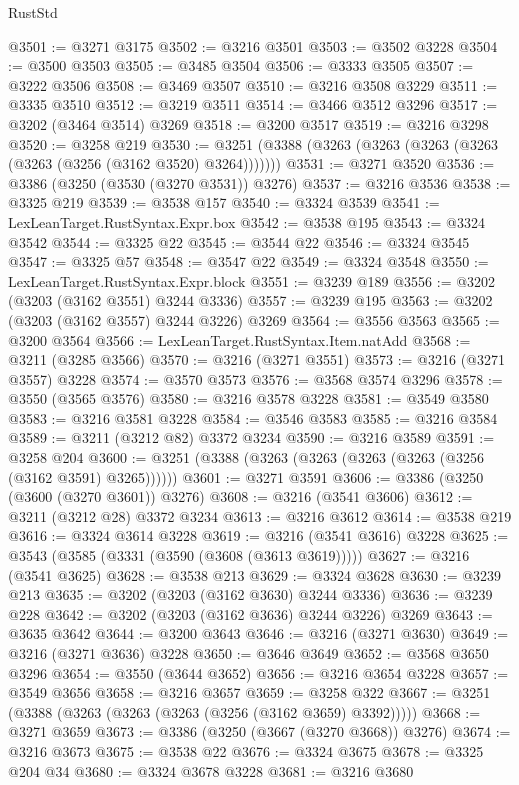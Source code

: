 \begin{lexlean}{RustStd}
\begin{coremodule}
@3501 := @3271 @3175
@3502 := @3216 @3501
@3503 := @3502 @3228
@3504 := @3500 @3503
@3505 := @3485 @3504
@3506 := @3333 @3505
@3507 := @3222 @3506
@3508 := @3469 @3507
@3510 := @3216 @3508 @3229
@3511 := @3335 @3510
@3512 := @3219 @3511
@3514 := @3466 @3512 @3296
@3517 := @3202 (@3464 @3514) @3269
@3518 := @3200 @3517
@3519 := @3216 @3298
@3520 := @3258 @219
@3530 := @3251 (@3388 (@3263 (@3263 (@3263 (@3263 (@3263 (@3256 (@3162 @3520) @3264)))))))
@3531 := @3271 @3520
@3536 := @3386 (@3250 (@3530 (@3270 @3531)) @3276)
@3537 := @3216 @3536
@3538 := @3325 @219
@3539 := @3538 @157
@3540 := @3324 @3539
@3541 := LexLeanTarget.RustSyntax.Expr.box
@3542 := @3538 @195
@3543 := @3324 @3542
@3544 := @3325 @22
@3545 := @3544 @22
@3546 := @3324 @3545
@3547 := @3325 @57
@3548 := @3547 @22
@3549 := @3324 @3548
@3550 := LexLeanTarget.RustSyntax.Expr.block
@3551 := @3239 @189
@3556 := @3202 (@3203 (@3162 @3551) @3244 @3336)
@3557 := @3239 @195
@3563 := @3202 (@3203 (@3162 @3557) @3244 @3226) @3269
@3564 := @3556 @3563
@3565 := @3200 @3564
@3566 := LexLeanTarget.RustSyntax.Item.natAdd
@3568 := @3211 (@3285 @3566)
@3570 := @3216 (@3271 @3551)
@3573 := @3216 (@3271 @3557) @3228
@3574 := @3570 @3573
@3576 := @3568 @3574 @3296
@3578 := @3550 (@3565 @3576)
@3580 := @3216 @3578 @3228
@3581 := @3549 @3580
@3583 := @3216 @3581 @3228
@3584 := @3546 @3583
@3585 := @3216 @3584
@3589 := @3211 (@3212 @82) @3372 @3234
@3590 := @3216 @3589
@3591 := @3258 @204
@3600 := @3251 (@3388 (@3263 (@3263 (@3263 (@3263 (@3256 (@3162 @3591) @3265))))))
@3601 := @3271 @3591
@3606 := @3386 (@3250 (@3600 (@3270 @3601)) @3276)
@3608 := @3216 (@3541 @3606)
@3612 := @3211 (@3212 @28) @3372 @3234
@3613 := @3216 @3612
@3614 := @3538 @219
@3616 := @3324 @3614 @3228
@3619 := @3216 (@3541 @3616) @3228
@3625 := @3543 (@3585 (@3331 (@3590 (@3608 (@3613 @3619)))))
@3627 := @3216 (@3541 @3625)
@3628 := @3538 @213
@3629 := @3324 @3628
@3630 := @3239 @213
@3635 := @3202 (@3203 (@3162 @3630) @3244 @3336)
@3636 := @3239 @228
@3642 := @3202 (@3203 (@3162 @3636) @3244 @3226) @3269
@3643 := @3635 @3642
@3644 := @3200 @3643
@3646 := @3216 (@3271 @3630)
@3649 := @3216 (@3271 @3636) @3228
@3650 := @3646 @3649
@3652 := @3568 @3650 @3296
@3654 := @3550 (@3644 @3652)
@3656 := @3216 @3654 @3228
@3657 := @3549 @3656
@3658 := @3216 @3657
@3659 := @3258 @322
@3667 := @3251 (@3388 (@3263 (@3263 (@3263 (@3256 (@3162 @3659) @3392)))))
@3668 := @3271 @3659
@3673 := @3386 (@3250 (@3667 (@3270 @3668)) @3276)
@3674 := @3216 @3673
@3675 := @3538 @22
@3676 := @3324 @3675
@3678 := @3325 @204 @34
@3680 := @3324 @3678 @3228
@3681 := @3216 @3680

\end{coremodule}
\end{lexlean}
